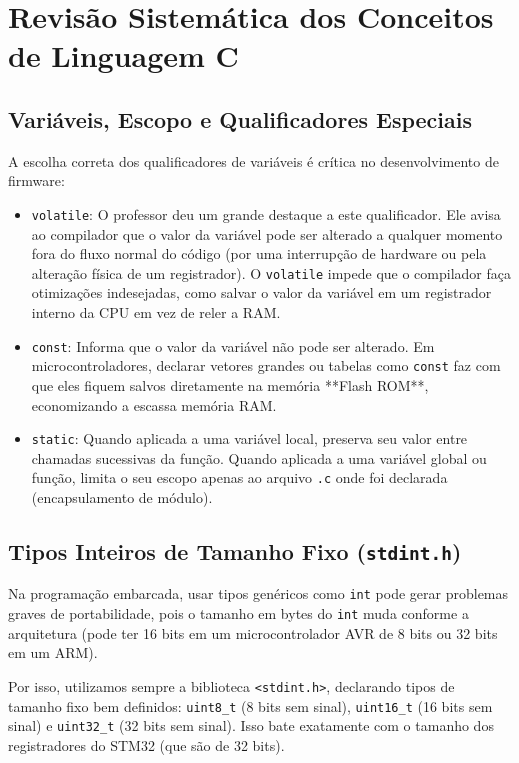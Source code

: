 \documentclass[12pt, a4paper]{article}
\begin{document}
\section{Revisão Sistemática dos Conceitos de Linguagem C}

\subsection{Variáveis, Escopo e Qualificadores Especiais}
\hspace*{1.25cm}A escolha correta dos qualificadores de variáveis é crítica no desenvolvimento de firmware:

\begin{itemize}
    \item \texttt{volatile}: O professor deu um grande destaque a este qualificador. Ele avisa ao compilador que o valor da variável pode ser alterado a qualquer momento fora do fluxo normal do código (por uma interrupção de hardware ou pela alteração física de um registrador). O \texttt{volatile} impede que o compilador faça otimizações indesejadas, como salvar o valor da variável em um registrador interno da CPU em vez de reler a RAM.
    \item \texttt{const}: Informa que o valor da variável não pode ser alterado. Em microcontroladores, declarar vetores grandes ou tabelas como \texttt{const} faz com que eles fiquem salvos diretamente na memória **Flash ROM**, economizando a escassa memória RAM.
    \item \texttt{static}: Quando aplicada a uma variável local, preserva seu valor entre chamadas sucessivas da função. Quando aplicada a uma variável global ou função, limita o seu escopo apenas ao arquivo \texttt{.c} onde foi declarada (encapsulamento de módulo).
\end{itemize}

\subsection{Tipos Inteiros de Tamanho Fixo (\texttt{stdint.h})}
\hspace*{1.25cm}Na programação embarcada, usar tipos genéricos como \texttt{int} pode gerar problemas graves de portabilidade, pois o tamanho em bytes do \texttt{int} muda conforme a arquitetura (pode ter 16 bits em um microcontrolador AVR de 8 bits ou 32 bits em um ARM). 

Por isso, utilizamos sempre a biblioteca \texttt{<stdint.h>}, declarando tipos de tamanho fixo bem definidos: \texttt{uint8\_t} (8 bits sem sinal), \texttt{uint16\_t} (16 bits sem sinal) e \texttt{uint32\_t} (32 bits sem sinal). Isso bate exatamente com o tamanho dos registradores do STM32 (que são de 32 bits).
\end{document}
